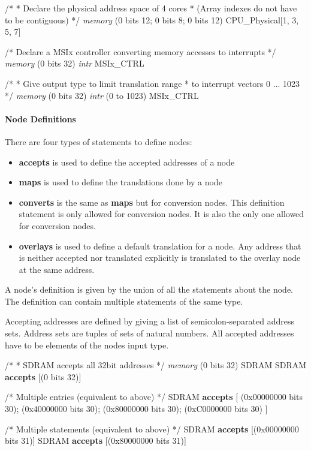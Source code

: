 \documentclass[a4paper,11pt,twoside]{report}
\begin{document}
{{{\begin{example}
  /* 
   * Declare the physical address space of 4 cores
   * (Array indexes do not have to be contiguous)
   */
  \textit{memory} (0 bits 12; 0 bits 8; 0 bits 12) CPU_Physical[1, 3, 5, 7]

  /* Declare a MSIx controller converting memory accesses to interrupts */
  \textit{memory} (0 bits 32) \textit{intr} MSIx_CTRL

  /*
   * Give output type to limit translation range
   * to interrupt vectors 0 ... 1023
   */
  \textit{memory} (0 bits 32) \textit{intr} (0 to 1023) MSIx_CTRL
\end{example}

\paragraph{Node Definitions}
There are four types of statements to define nodes:
\begin{itemize}
  \item \textbf{accepts} is used to define the accepted addresses of a node
  \item \textbf{maps} is used to define the translations done by a node
  \item \textbf{converts} is the same as \textbf{maps} but for conversion nodes.
  This definition statement is only allowed for conversion nodes.
  It is also the only one allowed for conversion nodes.
  \item \textbf{overlays} is used to define a default translation for a node.
  Any address that is neither accepted nor translated explicitly is translated to the overlay node at the same address.
\end{itemize}
A node's definition is given by the union of all the statements about the node.
The definition can contain multiple statements of the same type.

Accepting addresses are defined by giving a list of semicolon-separated address sets.
Address sets are tuples of sets of natural numbers.
All accepted addresses have to be elements of the nodes input type.
\begin{example}
  /*
   * SDRAM accepts all 32bit addresses
   */
  \textit{memory} (0 bits 32) SDRAM
  SDRAM \textbf{accepts} [(0 bits 32)]

 /* Multiple entries (equivalent to above) */
  SDRAM \textbf{accepts} [
    (0x00000000 bits 30);
    (0x40000000 bits 30);
    (0x80000000 bits 30);
    (0xC0000000 bits 30)
  ]

/* Multiple statements (equivalent to above) */
SDRAM \textbf{accepts} [(0x00000000 bits 31)]
SDRAM \textbf{accepts} [(0x80000000 bits 31)]
\end{example}

}}}
\end{document}
